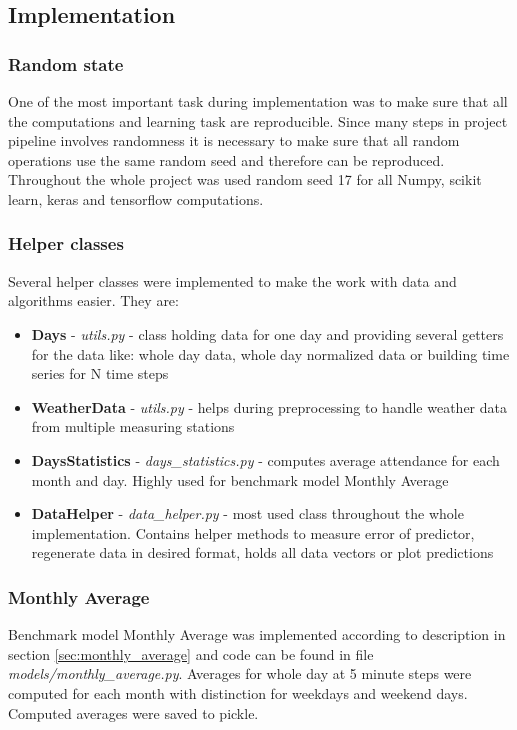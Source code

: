 \documentclass{article}
\begin{document}
\subsection{Implementation}
\subsubsection{Random state}
One of the most important task during implementation was to make sure that all the computations and learning task are reproducible. Since many steps in project pipeline involves randomness it is necessary to make sure that all random operations use the same random seed and therefore can be reproduced. Throughout the whole project was used random seed 17 for all Numpy, scikit learn, keras and tensorflow computations.

\subsubsection{Helper classes}
Several helper classes were implemented to make the work with data and algorithms easier. They are:
\begin{itemize}
    \item \textbf{Days} - \emph{utils.py} - class holding data for one day and providing several getters for the data like: whole day data, whole day normalized data or building time series for N time steps	        	\item \textbf{WeatherData} - \emph{utils.py} - helps during preprocessing to handle weather data from multiple measuring stations
    \item \textbf{DaysStatistics} - \emph{days\_statistics.py} - computes average attendance for each month and day. Highly used for benchmark model Monthly Average
    \item \textbf{DataHelper} - \emph{data\_helper.py} - most used class throughout the whole implementation. Contains helper methods to measure error of predictor, regenerate data in desired format, holds all data vectors or plot predictions
\end{itemize}

\subsubsection{Monthly Average}
Benchmark model Monthly Average was implemented according to description in section \ref{sec:monthly_average} and code can be found in file \emph{models/monthly\_average.py}. Averages for whole day at 5 minute steps were computed for each month with distinction for weekdays and weekend days. Computed averages were saved to pickle.
 
\end{document}
